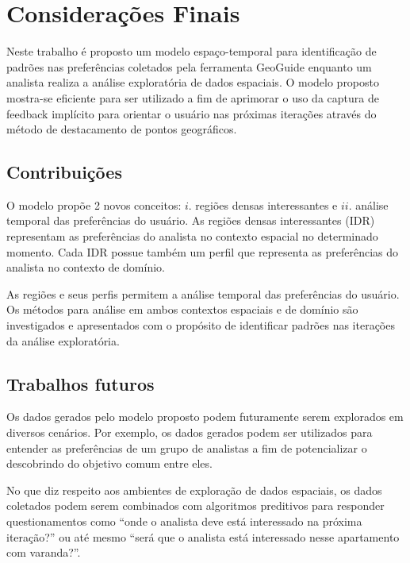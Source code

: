 \chapter{Considerações Finais}
\label{chap:conclusao}

Neste trabalho é proposto um modelo espaço-temporal para identificação de padrões nas preferências coletados pela ferramenta GeoGuide enquanto um analista realiza a análise exploratória de dados espaciais. O modelo proposto mostra-se eficiente para ser utilizado a fim de aprimorar o uso da captura de feedback implícito para orientar o usuário nas próximas iterações através do método de destacamento de pontos geográficos.

\section{Contribuições}

O modelo propõe 2 novos conceitos: $i$. regiões densas interessantes e $ii$. análise temporal das preferências do usuário. As regiões densas interessantes (IDR) representam as preferências do analista no contexto espacial no determinado momento. Cada IDR possue também um perfil que representa as preferências do analista no contexto de domínio.

As regiões e seus perfis permitem a análise temporal das preferências do usuário. Os métodos para análise em ambos contextos espaciais e de domínio são investigados e apresentados com o propósito de identificar padrões nas iterações da análise exploratória.

\section{Trabalhos futuros}

Os dados gerados pelo modelo proposto podem futuramente serem explorados em diversos cenários. Por exemplo, os dados gerados podem ser utilizados para entender as preferências de um grupo de analistas a fim de potencializar o descobrindo do objetivo comum entre eles.

No que diz respeito aos ambientes de exploração de dados espaciais, os dados coletados podem serem combinados com algoritmos preditivos para responder questionamentos como ``onde o analista deve está interessado na próxima iteração?'' ou até mesmo ``será que o analista está interessado nesse apartamento com varanda?''.  